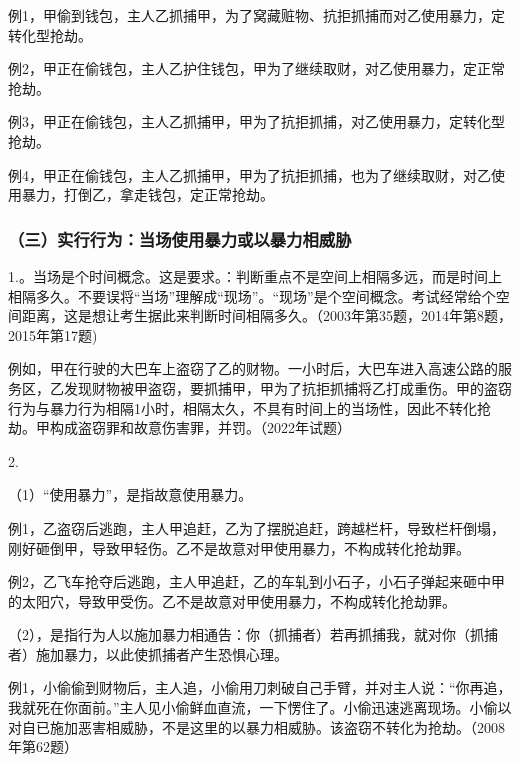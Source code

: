 
例1，甲偷到钱包，主人乙抓捕甲，为了窝藏赃物、抗拒抓捕而对乙使用暴力，定转化型抢劫。

例2，甲正在偷钱包，主人乙护住钱包，甲为了继续取财，对乙使用暴力，定正常抢劫。

例3，甲正在偷钱包，主人乙抓捕甲，甲为了抗拒抓捕，对乙使用暴力，定转化型抢劫。

例4，甲正在偷钱包，主人乙抓捕甲，甲为了抗拒抓捕，也为了继续取财，对乙使用暴力，打倒乙，拿走钱包，定正常抢劫。

\subsubsection*{（三）实行行为：当场使用暴力或以暴力相威胁}

1.。当场是个时间概念。这是要求。：判断重点不是空间上相隔多远，而是时间上相隔多久。不要误将“当场”理解成“现场”。“现场”是个空间概念。考试经常给个空间距离，这是想让考生据此来判断时间相隔多久。（2003年第35题，2014年第8题，2015年第17题)


例如，甲在行驶的大巴车上盗窃了乙的财物。一小时后，大巴车进入高速公路的服务区，乙发现财物被甲盗窃，要抓捕甲，甲为了抗拒抓捕将乙打成重伤。甲的盗窃行为与暴力行为相隔1小时，相隔太久，不具有时间上的当场性，因此不转化抢劫。甲构成盗窃罪和故意伤害罪，并罚。（2022年试题）

2.

（1）“使用暴力”，是指故意使用暴力。

例1，乙盗窃后逃跑，主人甲追赶，乙为了摆脱追赶，跨越栏杆，导致栏杆倒塌，刚好砸倒甲，导致甲轻伤。乙不是故意对甲使用暴力，不构成转化抢劫罪。

例2，乙飞车抢夺后逃跑，主人甲追赶，乙的车轧到小石子，小石子弹起来砸中甲的太阳穴，导致甲受伤。乙不是故意对甲使用暴力，不构成转化抢劫罪。

（2），是指行为人以施加暴力相通告：你（抓捕者）若再抓捕我，就对你（抓捕者）施加暴力，以此使抓捕者产生恐惧心理。

例1，小偷偷到财物后，主人追，小偷用刀刺破自己手臂，并对主人说：“你再追，我就死在你面前。”主人见小偷鲜血直流，一下愣住了。小偷迅速逃离现场。小偷以对自已施加恶害相威胁，不是这里的以暴力相威胁。该盗窃不转化为抢劫。（2008年第62题）

